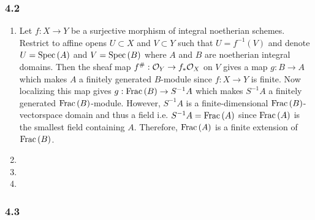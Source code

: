 \documentclass[12pt]{article}
\begin{document}
\subsubsection{4.2}

\begin{enumerate}
\item Let $f : X \to Y$ be a surjective morphism of integral noetherian schemes. Restrict to affine opens $U \subset X$ and $V \subset Y$ such that $U = f^{-1}(V)$ and denote $U = \mathrm{Spec}\left( A \right)$ and $V = \mathrm{Spec}\left( B \right)$ where $A$ and $B$ are noetherian integral domains. Then the sheaf map $f^\# : \mathcal{O}_{Y} \to f_* \mathcal{O}_{X}$ on $V$ gives a map $g : B \to A$ which makes $A$ a finitely generated $B$-module since $f : X \to Y$ is finite. Now localizing this map gives $g : \mathrm{Frac}\left(B\right) \to S^{-1} A$ which makes $S^{-1} A$ a finitely generated $\mathrm{Frac}\left(B\right)$-module. However, $S^{-1}A$ is a finite-dimensional $\mathrm{Frac}\left(B\right)$-vectorspace domain and thus a field i.e. $S^{-1} A = \mathrm{Frac}\left(A\right)$ since $\mathrm{Frac}\left(A\right)$ is the smallest field containing $A$. Therefore, $\mathrm{Frac}\left(A\right)$ is a finite extension of $\mathrm{Frac}\left(B\right)$. 

\item

\item

\item
\end{enumerate}

\subsubsection{4.3}
\end{document}
